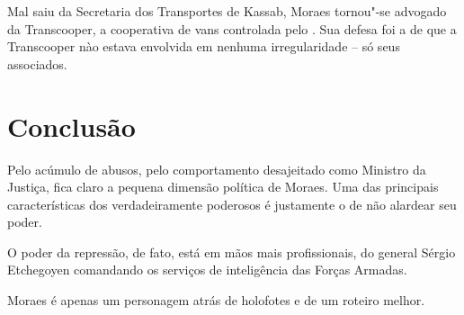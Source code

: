 Mal saiu da Secretaria dos Transportes de Kassab, Moraes tornou"-se
advogado da Transcooper, a cooperativa de vans controlada pelo . Sua
defesa foi a de que a Transcooper nào estava envolvida em nenhuma
irregularidade -- só seus associados.

\section{Conclusão}

Pelo acúmulo de abusos, pelo comportamento desajeitado como Ministro da
Justiça, fica claro a pequena dimensão política de Moraes. Uma das
principais características dos verdadeiramente poderosos é justamente o
de não alardear seu poder.

O poder da repressão, de fato, está em mãos mais profissionais, do
general Sérgio Etchegoyen comandando os serviços de inteligência das
Forças Armadas.

Moraes é apenas um personagem atrás de holofotes e de um roteiro melhor.
